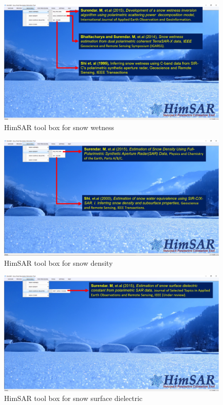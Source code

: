 \begin{figure}[!htbp]
	\centering
	\includegraphics[width=\columnwidth]{Figure_General/HimSAR1.png}
	\caption{HimSAR tool box for snow wetness} 
	\label{fig:HimSAR1}
\end{figure}
\begin{figure}[!htbp]
	\centering
	\includegraphics[width=\columnwidth]{Figure_General/HimSAR2.png}
	\caption{HimSAR tool box for snow density} 
	\label{fig:HimSAR2}
\end{figure}
\begin{figure}[!htbp]
	\centering
	\includegraphics[width=\columnwidth]{Figure_General/HimSAR3.png}
	\caption{HimSAR tool box for snow surface dielectric} 
	\label{fig:HimSAR3}
\end{figure}

